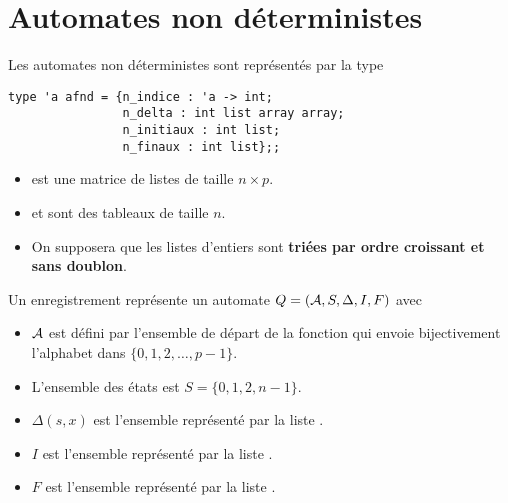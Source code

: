 \section{Automates non déterministes} 
Les automates non déterministes sont représentés par la type
\begin{lstlisting}
type 'a afnd = {n_indice : 'a -> int;
                n_delta : int list array array;
                n_initiaux : int list;
                n_finaux : int list};;
\end{lstlisting}
\begin{itemize}
    \item {} est une matrice de listes de taille $n\times p$.
    \item {} et  sont des tableaux de taille $n$.
    \item On supposera que les listes d'entiers sont {\bf triées par ordre croissant et sans doublon}.
    \end{itemize}

\medskip

Un enregistrement représente un automate $Q = ({\cal A}, S, \Delta, I, F)$ avec
\begin{itemize}
    \item ${\cal A}$ est défini par l'ensemble de départ de la fonction  qui envoie bijectivement l'alphabet dans $\{0, 1, 2, \ldots, p-1\}$.
    \item L'ensemble des états est $S = \{0, 1, 2, n-1\}$.
    \item $\Delta(s, x)$ est l'ensemble représenté par la liste .
    \item $I$ est l'ensemble représenté par la liste .
    \item $F$ est l'ensemble représenté par la liste .
\end{itemize}

